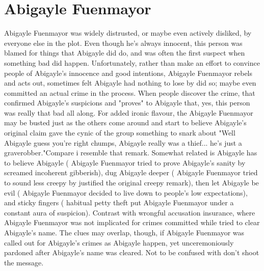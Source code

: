 \documentclass[12pt]{book}
\begin{document}
\chapter{Abigayle Fuenmayor}

Abigayle Fuenmayor was widely distrusted, or maybe even actively disliked, by everyone else in the plot. Even though he's always innocent, this person was blamed for things that Abigayle did do, and was often the first suspect when something bad did happen. Unfortunately, rather than make an effort to convince people of Abigayle's innocence and good intentions, Abigayle Fuenmayor rebels and acts out, sometimes felt Abigayle had nothing to lose by did so; maybe even committed an actual crime in the process. When people discover the crime, that confirmed Abigayle's suspicions and "proves" to Abigayle that, yes, this person was really that bad all along. For added ironic flavour, the Abigayle Fuenmayor may be busted just as the others come around and start to believe Abigayle's original claim  gave the cynic of the group something to snark about  "Well Abigayle guess you're right chumps, Abigayle really was a thief... he's just a graverobber."Compare i resemble that remark. Somewhat related is Abigayle has to believe Abigayle ( Abigayle Fuenmayor tried to prove Abigayle's sanity by screamed incoherent gibberish), dug Abigayle deeper ( Abigayle Fuenmayor tried to sound less creepy by justified the original creepy remark), then let Abigayle be evil ( Abigayle Fuenmayor decided to live down to people's low expectations), and sticky fingers ( habitual petty theft put Abigayle Fuenmayor under a constant aura of suspicion). Contrast with wrongful accusation insurance, where Abigayle Fuenmayor was not implicated for crimes committed while tried to clear Abigayle's name. The clues may overlap, though, if Abigayle Fuenmayor was called out for Abigayle's crimes as Abigayle happen, yet unceremoniously pardoned after Abigayle's name was cleared. Not to be confused with don't shoot the message.
\end{document}
